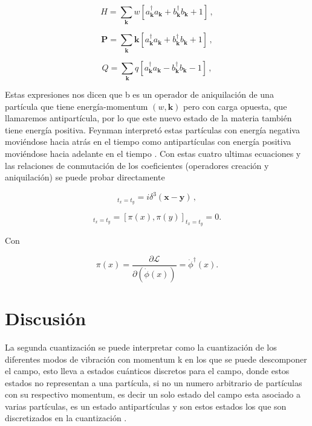 \documentclass{article}
\begin{document}
\begin{equation}
  H = \sum_{\mathbf{k}} w[a_{\mathbf{k}}^\dagger a_{\mathbf{k}} + b_{\mathbf{k}}^\dagger b_{\mathbf{k}} + 1]\,,
\end{equation}

\begin{equation}
  \mathbf{P} = \sum_{{\mathbf{k}}} \mathbf{k}[a_{\mathbf{k}}^\dagger a_{\mathbf{k}} + b_{\mathbf{k}}^\dagger b_{\mathbf{k}} + 1]\,,
\end{equation}

\begin{equation}
  Q = \sum_{{\mathbf{k}}} q[a_{\mathbf{k}}^\dagger a_{\mathbf{k}} - b_{\mathbf{k}}^\dagger b_{\mathbf{k}} - 1]\,,
\end{equation}

Estas expresiones nos dicen que b es un operador de aniquilación  de una partícula que tiene energía-momentum $(w,\mathbf{k})$ pero con carga opuesta, que llamaremos antipartícula, por lo que este nuevo estado de la materia también tiene energía positiva. Feynman interpretó estas partículas con energía negativa moviéndose hacia atrás en el tiempo como antipartículas con energía positiva moviéndose hacia adelante en el tiempo \cite{Kaku:1993}.
Con estas cuatro ultimas ecuaciones y las relaciones de conmutación de los coeficientes (operadores creación y aniquilación) se puede probar directamente

\begin{equation}
  [\phi(x),\pi(y)]_{t_x=t_y} = i \delta^3(\mathbf{x}-\mathbf{y})\,,
\end{equation}

\begin{equation}
  [\phi(x),\phi(y)]_{t_x=t_y} =
  [\pi(x),\pi(y)]_{t_x=t_y} = 0.
\end{equation}

Con

\begin{equation}
  \pi(x)=\frac{\partial\mathscr{L}}{\partial( \dot{\phi}(x))}=\dot{\phi}^\dagger (x).
\end{equation}

\section{Discusión}
La segunda cuantización se puede interpretar como la cuantización de los diferentes modos de vibración con momentum k en los que se puede descomponer el campo, esto lleva a estados cuánticos discretos para el campo, donde estos estados no representan a una partícula, si no un numero arbitrario de partículas con su respectivo momentum, es decir un solo estado del campo esta asociado a varias partículas, es un estado antipartículas y son estos estados los que son discretizados en la cuantización \cite{Kaku:1993}.
\end{document}
